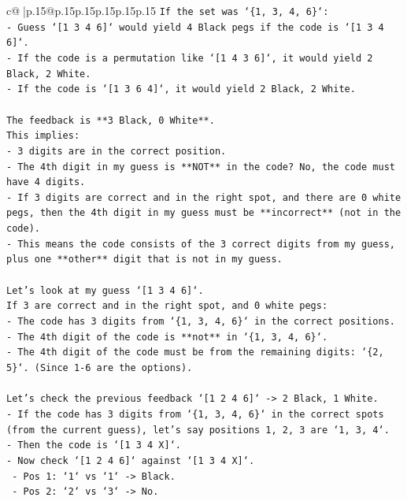 \documentclass{article}
\begin{document}
{\begin{supertabular}{c@{$\;$}|p{.15\linewidth}@{}p{.15\linewidth}p{.15\linewidth}p{.15\linewidth}p{.15\linewidth}p{.15\linewidth}}
{{{\texttt{If the set was `\{1, 3, 4, 6\}`:} \\
\texttt{{-} Guess `{[}1 3 4 6{]}` would yield 4 Black pegs if the code is `{[}1 3 4 6{]}`.} \\
\texttt{{-} If the code is a permutation like `{[}1 4 3 6{]}`, it would yield 2 Black, 2 White.} \\
\texttt{{-} If the code is `{[}1 3 6 4{]}`, it would yield 2 Black, 2 White.} \\
\\ 
\texttt{The feedback is **3 Black, 0 White**.} \\
\texttt{This implies:} \\
\texttt{{-} 3 digits are in the correct position.} \\
\texttt{{-} The 4th digit in my guess is **NOT** in the code? No, the code must have 4 digits.} \\
\texttt{{-} If 3 digits are correct and in the right spot, and there are 0 white pegs, then the 4th digit in my guess must be **incorrect** (not in the code).} \\
\texttt{{-} This means the code consists of the 3 correct digits from my guess, plus one **other** digit that is not in my guess.} \\
\\ 
\texttt{Let's look at my guess `{[}1 3 4 6{]}`.} \\
\texttt{If 3 are correct and in the right spot, and 0 white pegs:} \\
\texttt{{-} The code has 3 digits from `\{1, 3, 4, 6\}` in the correct positions.} \\
\texttt{{-} The 4th digit of the code is **not** in `\{1, 3, 4, 6\}`.} \\
\texttt{{-} The 4th digit of the code must be from the remaining digits: `\{2, 5\}`. (Since 1{-}6 are the options).} \\
\\ 
\texttt{Let's check the previous feedback `{[}1 2 4 6{]}` {-}> 2 Black, 1 White.} \\
\texttt{{-} If the code has 3 digits from `\{1, 3, 4, 6\}` in the correct spots (from the current guess), let's say positions 1, 2, 3 are `1, 3, 4`.} \\
\texttt{{-} Then the code is `{[}1 3 4 X{]}`.} \\
\texttt{{-} Now check `{[}1 2 4 6{]}` against `{[}1 3 4 X{]}`.} \\
\texttt{    {-} Pos 1: `1` vs `1` {-}> Black.} \\
\texttt{    {-} Pos 2: `2` vs `3` {-}> No.} \\
}}}
\end{supertabular}}
\end{document}
